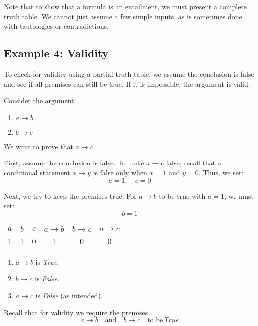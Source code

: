 \documentclass[12pt,a4paper,openany]{article}
\begin{document}
Note that to show that a formula is an entailment, we must present a complete truth table.
We cannot just assume a few simple inputs, as is sometimes done with tautologies or contradictions.

\subsection{Example 4: Validity}

To check for validity using a partial truth table, we assume the conclusion is false and see if all premises can still be true. If it is impossible, the argument is valid.

Consider the argument:
\begin{enumerate}
    \item $a \rightarrow b$
    \item $b \rightarrow c$
\end{enumerate}
We want to prove that $a \rightarrow c$.

First, assume the conclusion is false. To make $a \rightarrow c$ false, recall that a conditional statement $x \rightarrow y$ is false only when $x = 1$ and $y = 0$.
Thus, we set:
$$ a = 1, \quad c = 0 $$

Next, we try to keep the premises true. For $a \rightarrow b$ to be true with $a = 1$, we must set:
$$ b = 1 $$

\begin{center}
\begin{tabular}{|c|c|c|c|c|c|}
\hline
$a$ & $b$ & $c$ & $a \rightarrow b$ & $b \rightarrow c$ & $a \rightarrow c$ \\
\hline
\textcolor{truecolor}{1} & \textcolor{truecolor}{1} & \textcolor{falsecolor}{0} & \textcolor{truecolor}{1} & \textcolor{falsecolor}{0} & \textcolor{falsecolor}{0} \\
\hline
\end{tabular}
\end{center}

\begin{enumerate}
    \item $a \rightarrow b$ is \textit{True}.
    \item $b \rightarrow c$ is \textit{False}.
    \item $a \rightarrow c$ is \textit{False} (as intended).
\end{enumerate}

Recall that for validity we require the premises
$$a \rightarrow b \quad \text{and} \quad b \rightarrow c \quad \text{to be} \ \textit{True}$$
\end{document}

